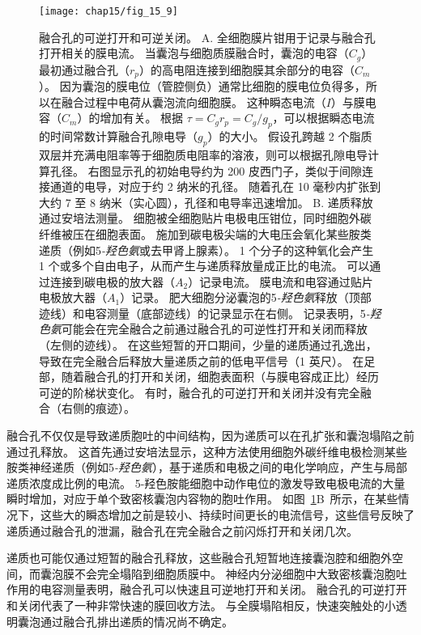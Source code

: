 \begin{figure}[htbp]
	\centering
	\texttt{[image: chap15/fig\_15\_9]}
	\caption{融合孔的可逆打开和可逆关闭。
		A. 全细胞膜片钳用于记录与融合孔打开相关的膜电流。
		当囊泡与细胞质膜融合时，囊泡的电容（$C_g$）最初通过融合孔（$r_p$）的高电阻连接到细胞膜其余部分的电容（$C_m$）。
		因为囊泡的膜电位（管腔侧负）通常比细胞的膜电位负得多，所以在融合过程中电荷从囊泡流向细胞膜。
		这种瞬态电流（$I$）与膜电容（$C_m$）的增加有关。
		根据 $\tau = C_g r_p = C_g / g_p$，可以根据瞬态电流的时间常数计算融合孔隙电导（$g_p$）的大小。
		假设孔跨越 2 个脂质双层并充满电阻率等于细胞质电阻率的溶液，则可以根据孔隙电导计算孔径。
		右图显示孔的初始电导约为 200 皮西门子，类似于间隙连接通道的电导，对应于约 2 纳米的孔径。
		随着孔在 10 毫秒内扩张到大约 7 至 8 纳米（实心圆），孔径和电导率迅速增加\cite{monck1992exocytotic,spruce1990properties}。
		B. 递质释放通过安培法测量。
		细胞被全细胞贴片电极电压钳位，同时细胞外碳纤维被压在细胞表面。
		施加到碳电极尖端的大电压会氧化某些胺类递质（例如5\textit{-羟色氨}或去甲肾上腺素）。
		1 个分子的这种氧化会产生 1 个或多个自由电子，从而产生与递质释放量成正比的电流。
		可以通过连接到碳电极的放大器（$A_2$）记录电流。
		膜电流和电容通过贴片电极放大器（$A_1$）记录。
		肥大细胞分泌囊泡的5\textit{-羟色氨}释放（顶部迹线）和电容测量（底部迹线）的记录显示在右侧。
		记录表明，5\textit{-羟色氨}可能会在完全融合之前通过融合孔的可逆性打开和关闭而释放（左侧的迹线）。
		在这些短暂的开口期间，少量的递质通过孔逸出，导致在完全融合后释放大量递质之前的低电平信号（1 英尺）。
		在足部，随着融合孔的打开和关闭，细胞表面积（与膜电容成正比）经历可逆的阶梯状变化。
		有时，融合孔的可逆打开和关闭并没有完全融合（右侧的痕迹）。}
	\label{fig:15_9}
\end{figure}


融合孔不仅仅是导致递质胞吐的中间结构，因为递质可以在孔扩张和囊泡塌陷之前通过孔释放。
这首先通过安培法显示，这种方法使用细胞外碳纤维电极检测某些胺类神经递质（例如5\textit{-羟色氨}），基于递质和电极之间的电化学响应，产生与局部递质浓度成比例的电流。
5-羟色胺能细胞中动作电位的激发导致电极电流的大量瞬时增加，对应于单个致密核囊泡内容物的胞吐作用。
如图~\ref{fig:15_9}B~所示，在某些情况下，这些大的瞬态增加之前是较小、持续时间更长的电流信号，这些信号反映了递质通过融合孔的泄漏，融合孔在完全融合之前闪烁打开和关闭几次。


递质也可能仅通过短暂的融合孔释放，这些融合孔短暂地连接囊泡腔和细胞外空间，而囊泡膜不会完全塌陷到细胞质膜中。
神经内分泌细胞中大致密核囊泡胞吐作用的电容测量表明，融合孔可以快速且可逆地打开和关闭。
融合孔的可逆打开和关闭代表了一种非常快速的膜回收方法。
与全膜塌陷相反，快速突触处的小透明囊泡通过融合孔排出递质的情况尚不确定。



